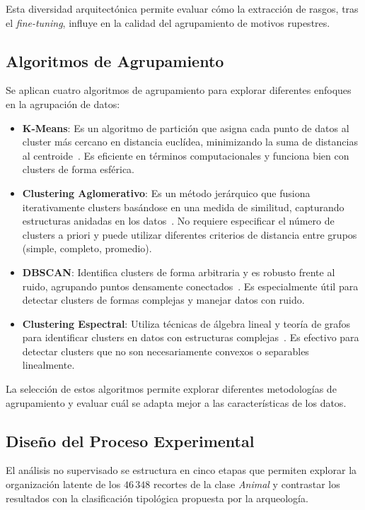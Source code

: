 Esta diversidad arquitectónica permite evaluar cómo la extracción de rasgos, tras el \emph{fine-tuning}, influye en la calidad del agrupamiento de motivos rupestres.

\subsection{Algoritmos de Agrupamiento}

Se aplican cuatro algoritmos de agrupamiento para explorar diferentes enfoques en la agrupación de datos:

\begin{itemize}
    \item \textbf{K-Means}:
    Es un algoritmo de partición que asigna cada punto de datos al cluster más cercano en distancia euclídea, minimizando la suma de distancias al centroide~\cite{macqueen1967some}.
    Es eficiente en términos computacionales y funciona bien con clusters de forma esférica.
    \item \textbf{Clustering Aglomerativo}:
    Es un método jerárquico que fusiona iterativamente clusters basándose en una medida de similitud, capturando estructuras anidadas en los datos~\cite{rokach2005clustering}.
    No requiere especificar el número de clusters a priori y puede utilizar diferentes criterios de distancia entre grupos (simple, completo, promedio).
    \item \textbf{DBSCAN}:
    Identifica clusters de forma arbitraria y es robusto frente al ruido, agrupando puntos densamente conectados~\cite{ester1996density}.
    Es especialmente útil para detectar clusters de formas complejas y manejar datos con ruido.
    \item \textbf{Clustering Espectral}:
    Utiliza técnicas de álgebra lineal y teoría de grafos para identificar clusters en datos con estructuras complejas~\cite{ng2002spectral}.
    Es efectivo para detectar clusters que no son necesariamente convexos o separables linealmente.
\end{itemize}

La selección de estos algoritmos permite explorar diferentes metodologías de agrupamiento y evaluar cuál se adapta mejor a las características de los datos.

\subsection{Diseño del Proceso Experimental}\label{sec:unsup_design}

El análisis no supervisado se estructura en cinco etapas que permiten explorar la organización latente de los \(46\,348\) recortes de la clase \textit{Animal} y contrastar los resultados con la clasificación tipológica propuesta por la arqueología.

